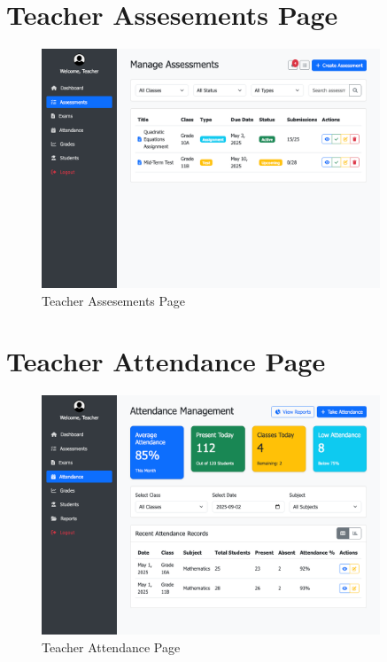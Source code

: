 \documentclass[12pt,a4paper]{report}
\begin{document}
\section{Teacher Assesements Page}
\begin{figure}[htbp]
    \centering
    \includegraphics[width=0.9\textwidth]{teacher-assessments-page.png}
    \caption{Teacher Assesements Page}
    \label{fig:teacher-assessments-page}
\end{figure}

\section{Teacher Attendance Page}
\begin{figure}[htbp]
    \centering
    \includegraphics[width=0.9\textwidth]{teacher-attendance-page.png}
    \caption{Teacher Attendance Page}
    \label{fig:teacher-attendance-page}
\end{figure}
\end{document}
